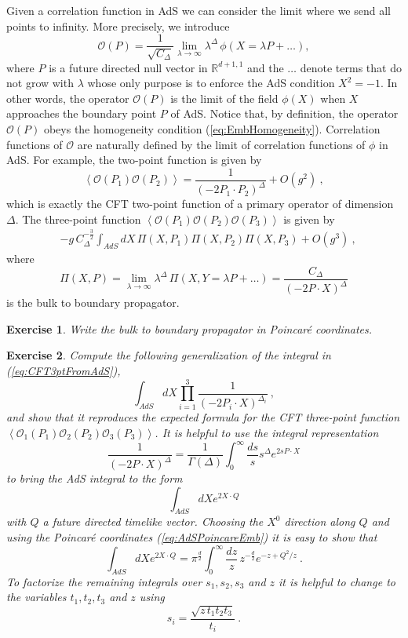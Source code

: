 \documentclass{ws-rv9x6}
\newtheorem{exercise}{Exercise}[section]
\newcommand\be{\begin{equation}}
\newcommand\ee{\end{equation}}
\begin{document}
Given a correlation function in AdS we can consider the limit where
we send all points to infinity. More precisely, we introduce 
\begin{equation}
\mathcal{O}(P)=\frac{1}{\sqrt{C_{\Delta}}}\lim_{\lambda\to\infty}\lambda^{\Delta}\,\phi\left(X=\lambda P+\dots\right),\label{eq:OaslimitofPhi}
\end{equation}
where $P$ is a future directed null vector in $\mathbb{R}^{d+1,1}$
and the $\dots$ denote terms that do not grow with $\lambda$ whose
only purpose is to enforce the AdS condition $X^{2}=-1$. In other
words, the operator $\mathcal{O}(P)$ is the limit of the field $\phi(X)$
when $X$ approaches the boundary point $P$ of AdS. Notice that,
by definition, the operator $\mathcal{O}(P)$ obeys the homogeneity
condition (\ref{eq:EmbHomogeneity}). Correlation functions of $\mathcal{O}$
are naturally defined by the limit of correlation functions of $\phi$
in AdS. For example, the two-point function is given by
\begin{equation}
\left\langle \mathcal{O}(P_{1})\mathcal{O}(P_{2})\right\rangle =\frac{1}{\left(-2P_{1}\cdot P_{2}\right)^{\Delta}}+O(g^{2})\ ,\label{eq:CFT2ptfromAdS}
\end{equation}
which is exactly the CFT two-point function of a primary operator
of dimension $\Delta$. The three-point function $\left\langle \mathcal{O}(P_{1})\mathcal{O}(P_{2})\mathcal{O}(P_{3})\right\rangle$ is given by
\begin{align}
&\label{eq:CFT3ptFromAdS} -g\, C_{\Delta}^{-\frac{3}{2}}\int_{AdS}dX\,\Pi(X,P_{1})\Pi(X,P_{2})\Pi(X,P_{3})
+O(g^{3})
\ , 
\end{align}
where
\be
\Pi(X,P)=\lim_{\lambda\to\infty}\lambda^{\Delta}\,\Pi\left(X,Y=\lambda P+\dots\right)=\frac{C_{\Delta}}{\left(-2P\cdot X\right)^{\Delta}}
\ee
is the bulk to boundary propagator.
\begin{exercise} 
Write the bulk to boundary propagator in Poincaré coordinates.
\end{exercise} 
\begin{exercise} 
\label{ex:3pt}
Compute the following generalization of the integral
in (\ref{eq:CFT3ptFromAdS}), 
\be
\int_{AdS}dX\prod_{i=1}^{3}\frac{1}{\left(-2P_{i}\cdot X\right)^{\Delta_{i}}}\ ,
\ee
and show that it reproduces the expected formula for the CFT three-point
function $\left\langle \mathcal{O}_{1}(P_{1})\mathcal{O}_{2}(P_{2})\mathcal{O}_{3}(P_{3})\right\rangle $.
It is helpful to use the integral representation
\be
\frac{1}{\left(-2P\cdot X\right)^{\Delta}}=\frac{1}{\Gamma(\Delta)}\int_{0}^{\infty}\frac{ds}{s}s^{\Delta}e^{2sP\cdot X}
\ee
to bring the AdS integral to the form
\be
\int_{AdS}dXe^{2X\cdot Q}
\ee
with $Q$ a future directed timelike vector. Choosing the $X^{0}$
direction along $Q$ and using the Poincaré coordinates (\ref{eq:AdSPoincareEmb})
it is easy to show that
\be
\int_{AdS}dXe^{2X\cdot Q}=\pi^{\frac{d}{2}}\int_{0}^{\infty}\frac{dz}{z}\, z^{-\frac{d}{2}}e^{-z+Q^{2}/z}\ .
\ee
To factorize the remaining integrals over $s_{1},s_{2},s_{3}$ and
$z$ it is helpful to change to the variables $t_{1},t_{2},t_{3}$
and $z$ using 
\be
s_{i}=\frac{\sqrt{z\, t_{1}t_{2}t_{3}}}{t_{i}}\ .
\ee
\end{exercise} 
\end{document}
